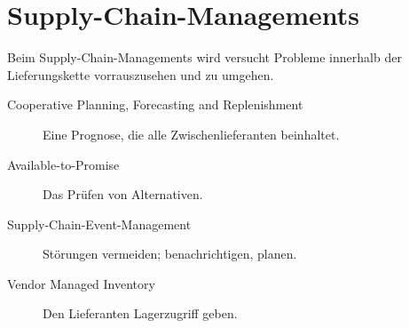 \documentclass{article}
\begin{document}
\section{Supply-Chain-Managements} 
Beim Supply-Chain-Managements wird versucht Probleme innerhalb der Lieferungskette vorrauszusehen und zu umgehen.
\begin{description}
 \item[Cooperative Planning, Forecasting and Replenishment] Eine Prognose, die alle Zwischenlieferanten beinhaltet.
 \item[Available-to-Promise] Das Prüfen von Alternativen.
 \item[Supply-Chain-Event-Management] Störungen vermeiden; benachrichtigen, planen.
 \item[Vendor Managed Inventory] Den Lieferanten Lagerzugriff geben.
\end{description}
\end{document}
